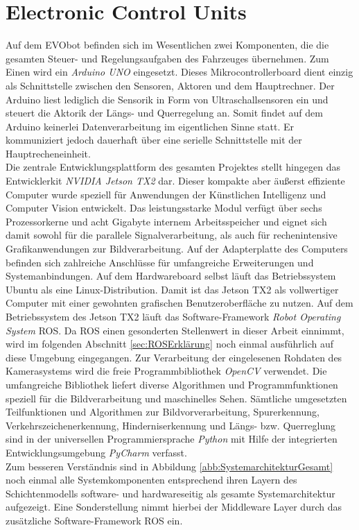 \section{Electronic Control Units}				\label{sec:EVObotSoftware}
Auf dem EVObot befinden sich im Wesentlichen zwei Komponenten, die die gesamten Steuer- und Regelungsaufgaben des Fahrzeuges übernehmen. Zum Einen wird ein \emph{Arduino UNO} eingesetzt. Dieses Mikrocontrollerboard dient einzig als Schnittstelle zwischen den Sensoren, Aktoren und dem Hauptrechner. Der Arduino liest lediglich die Sensorik in Form von Ultraschallsensoren ein und steuert die Aktorik der Längs- und Querregelung an. Somit findet auf dem Arduino keinerlei Datenverarbeitung im eigentlichen Sinne statt. Er kommuniziert jedoch dauerhaft über eine serielle Schnittstelle mit der Hauptrecheneinheit.\\
Die zentrale Entwicklungsplattform des gesamten Projektes stellt hingegen das Entwicklerkit \emph{NVIDIA Jetson TX2} dar. Dieser kompakte aber äußerst effiziente Computer wurde speziell für Anwendungen der Künstlichen Intelligenz und Computer Vision entwickelt. Das leistungsstarke Modul verfügt über sechs Prozessorkerne und acht Gigabyte internem Arbeitsspeicher und eignet sich damit sowohl für die parallele Signalverarbeitung, als auch für rechenintensive Grafikanwendungen zur Bildverarbeitung. Auf der Adapterplatte des Computers befinden sich zahlreiche Anschlüsse für umfangreiche Erweiterungen und Systemanbindungen. Auf dem Hardwareboard selbst läuft das Betriebssystem Ubuntu als eine Linux-Distribution. Damit ist das Jetson TX2 als vollwertiger Computer mit einer gewohnten grafischen Benutzeroberfläche zu nutzen. Auf dem Betriebssystem des Jetson TX2 läuft das Software-Framework \emph{Robot Operating System} \acs{ROS}. Da \acs{ROS} einen gesonderten Stellenwert in dieser Arbeit einnimmt, wird im folgenden Abschnitt \ref{sec:ROSErklärung} noch einmal ausführlich auf diese Umgebung eingegangen. Zur Verarbeitung der eingelesenen Rohdaten des Kamerasystems wird die freie Programmbibliothek \emph{OpenCV} verwendet. Die umfangreiche Bibliothek liefert diverse Algorithmen und Programmfunktionen speziell für die Bildverarbeitung und maschinelles Sehen. Sämtliche umgesetzten Teilfunktionen und Algorithmen zur Bildvorverarbeitung, Spurerkennung, Verkehrszeichenerkennung, Hinderniserkennung und Längs- bzw. Querreglung sind in der universellen Programmiersprache \emph{Python} mit Hilfe der integrierten Entwicklungsumgebung \emph{PyCharm} verfasst.\\
Zum besseren Verständnis sind in Abbildung \ref{abb:SystemarchitekturGesamt} noch einmal alle Systemkomponenten entsprechend ihren Layern des Schichtenmodells software- und hardwareseitig als gesamte Systemarchitektur aufgezeigt. Eine Sonderstellung nimmt hierbei der Middleware Layer durch das zusätzliche Software-Framework ROS ein. 

